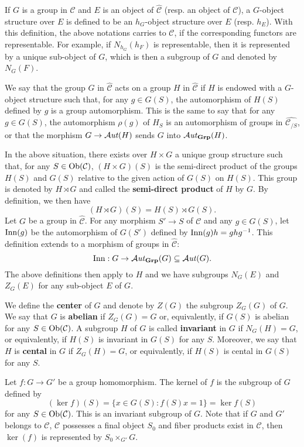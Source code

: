 If $G$ is a group in $\mathcal{C}$ and $E$ is an object of $\widehat{\mathcal{C}}$ (resp. an object of $\mathcal{C}$), a $G$-object structure over $E$ is defined to be an $h_G$-object structure over $E$ (resp. $h_E$). With this definition, the above notations carries to $\mathcal{C}$, if the corresponding functors are representable. For example, if $N_{h_G}(h_F)$ is representable, then it is represented by a unique sub-object of $G$, which is then a subgroup of $G$ and denoted by $N_G(F)$.\par
We say that the group $G$ in $\widehat{\mathcal{C}}$ acts on a group $H$ in $\widehat{\mathcal{C}}$ if $H$ is endowed with a $G$-object structure such that, for any $g\in G(S)$, the automorphism of $H(S)$ defined by $g$ is a group automorphism. This is the same to say that for any $g\in G(S)$, the automorphism $\rho(g)$ of $H_S$ is an automorphism of groups in $\widehat{\mathcal{C}_{/S}}$, or that the morphism $G\to\operatorname{\mathcal{A}\hspace*{-0.2pt}\textit{ut}\hspace{0.5pt}}(H)$ sends $G$ into $\operatorname{\mathcal{A}\hspace*{-0.2pt}\textit{ut}\hspace{0.5pt}}_{\mathbf{Grp}}(H)$.\par
In the above situation, there exists over $H\times G$ a unique group structure such that, for any $S\in\mathrm{Ob}(\mathcal{C})$, $(H\times G)(S)$ is the semi-direct product of the groups $H(S)$ and $G(S)$ relative to the given action of $G(S)$ on $H(S)$. This group is denoted by $H\rtimes G$ and called the \textbf{semi-direct product} of $H$ by $G$. By definition, we then have
\[(H\rtimes G)(S)=H(S)\rtimes G(S).\]
Let $G$ be a group in $\widehat{\mathcal{C}}$. For any morphism $S'\to S$ of $\mathcal{C}$ and any $g\in G(S)$, let $\mathrm{Inn}(g)$ be the automorphism of $G(S')$ defined by $\mathrm{Inn}(g)h=ghg^{-1}$. This definition extends to a morphism of groups in $\widehat{\mathcal{C}}$:
\[\mathrm{Inn}:G\to\operatorname{\mathcal{A}\hspace*{-0.2pt}\textit{ut}\hspace{0.5pt}}_{\mathbf{Grp}}(G)\subseteq\operatorname{\mathcal{A}\hspace*{-0.2pt}\textit{ut}\hspace{0.5pt}}(G).\]
The above definitions then apply to $H$ and we have subgroups $N_G(E)$ and $Z_G(E)$ for any sub-object $E$ of $G$.

\begin{definition}
We define the \textbf{center} of $G$ and denote by $Z(G)$ the subgroup $Z_G(G)$ of $G$. We say that $G$ is \textbf{abelian} if $Z_G(G)=G$ or, equivalently, if $G(S)$ is abelian for any $S\in\mathrm{Ob}(\mathcal{C})$. A subgroup $H$ of $G$ is called \textbf{invariant} in $G$ if $N_G(H)=G$, or equivalently, if $H(S)$ is invariant in $G(S)$ for any $S$. Moreover, we say that $H$ is \textbf{cental} in $G$ if $Z_G(H)=G$, or equivalently, if $H(S)$ is cental in $G(S)$ for any $S$.
\end{definition}

\begin{definition}
Let $f:G\to G'$ be a group homomorphism. The kernel of $f$ is the subgroup of $G$ defined by
\[(\ker f)(S)=\{x\in G(S):f(S)x=1\}=\ker f(S)\]
for any $S\in\mathrm{Ob}(\mathcal{C})$. This is an invariant subgroup of $G$. Note that if $G$ and $G'$ belongs to $\mathcal{C}$, $\mathcal{C}$ possesses a final object $S_0$ and fiber products exist in $\mathcal{C}$, then $\ker(f)$ is represented by $S_0\times_{G'}G$.
\end{definition}

